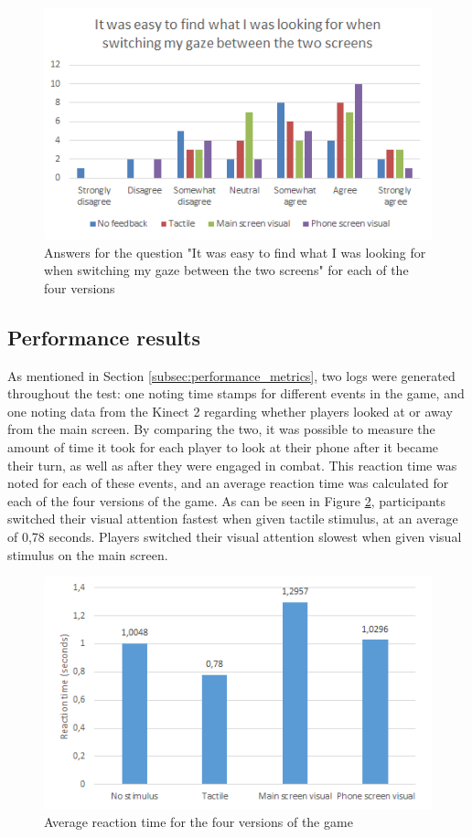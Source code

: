 \begin{figure}[hp!]
	\centering
	\includegraphics[scale=1]{figures/questionnaire_f.png}
	\caption{Answers for the question "It was easy to find what I was looking for when switching my gaze between the two screens" for each of the four versions}\label{fig:questionnaire_f}
\end{figure}

\subsection{Performance results}
As mentioned in Section \ref{subsec:performance_metrics}, two logs were generated throughout the test: one noting time stamps for different events in the game, and one noting data from the Kinect 2 regarding whether players looked at or away from the main screen. By comparing the two, it was possible to measure the amount of time it took for each player to look at their phone after it became their turn, as well as after they were engaged in combat. This reaction time was noted for each of these events, and an average reaction time was calculated for each of the four versions of the game. As can be seen in Figure \ref{fig:reaction_time}, participants switched their visual attention fastest when given tactile stimulus, at an average of 0,78 seconds. Players switched their visual attention slowest when given visual stimulus on the main screen.

\begin{figure}[h!]
	\centering
	\includegraphics[scale=1]{figures/reaction_time.png}
	\caption{Average reaction time for the four versions of the game}\label{fig:reaction_time}
\end{figure}

